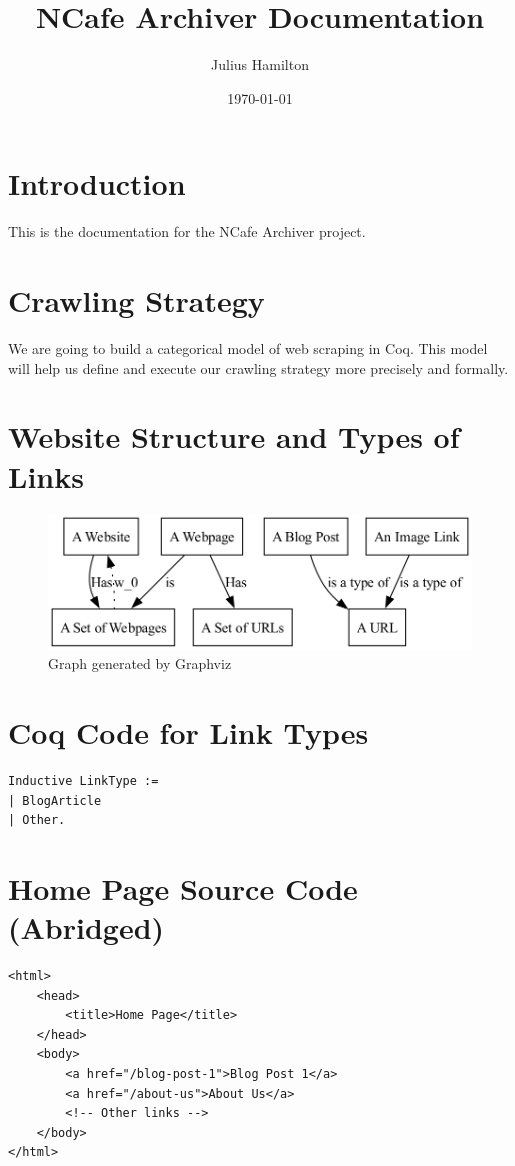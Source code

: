 \documentclass{article}
\title{NCafe Archiver Documentation}
\author{Julius Hamilton}
\date{\today}
\begin{document}
\maketitle

\section{Introduction}
This is the documentation for the NCafe Archiver project.

\section{Crawling Strategy}
We are going to build a categorical model of web scraping in Coq. This model will help us define and execute our crawling strategy more precisely and formally.

\section{Website Structure and Types of Links}




\begin{figure}[H]
    \centering
    \includegraphics[width=\textwidth]{graph.png}
    \caption{Graph generated by Graphviz}
\end{figure}



\section{Coq Code for Link Types}

\begin{verbatim}
Inductive LinkType :=
| BlogArticle
| Other.
\end{verbatim}

\section{Home Page Source Code (Abridged)}

\begin{verbatim}
<html>
    <head>
        <title>Home Page</title>
    </head>
    <body>
        <a href="/blog-post-1">Blog Post 1</a>
        <a href="/about-us">About Us</a>
        <!-- Other links -->
    </body>
</html>
\end{verbatim}
\end{document}
